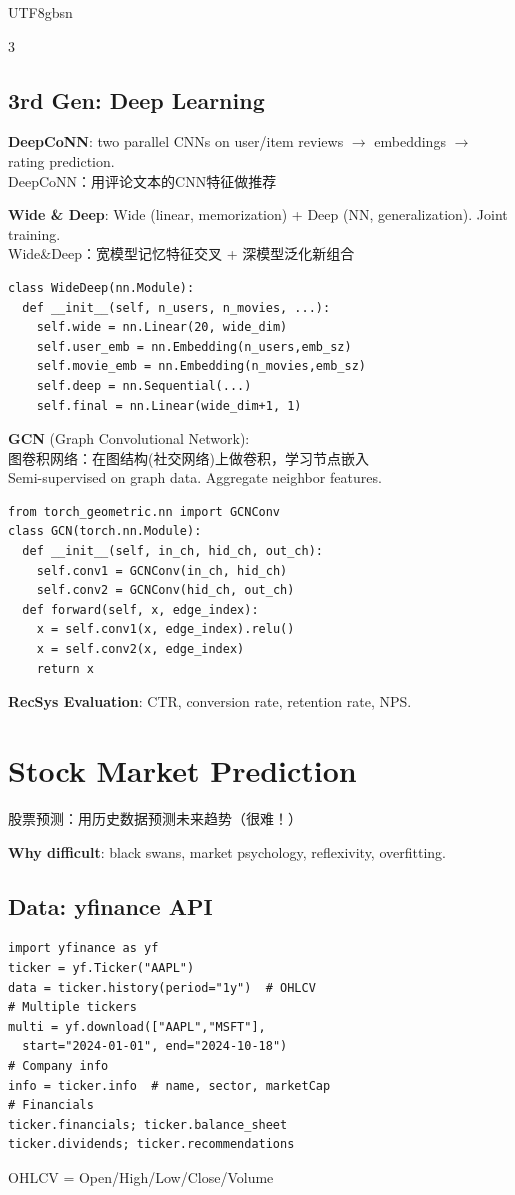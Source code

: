 \documentclass[9pt,landscape,a4paper]{article}
\newcommand{\zhint}[1]{{\scriptsize\color{gray!70!black}#1}}
\begin{document}
\begin{CJK}{UTF8}{gbsn}
\begin{multicols}{3}
\subsection{3rd Gen: Deep Learning}

\textbf{DeepCoNN}: two parallel CNNs on user/item reviews $\to$ embeddings $\to$ rating prediction.\\
\zhint{DeepCoNN：用评论文本的CNN特征做推荐}

\textbf{Wide \& Deep}: Wide (linear, memorization) + Deep (NN, generalization). Joint training.\\
\zhint{Wide\&Deep：宽模型记忆特征交叉 + 深模型泛化新组合}

\begin{lstlisting}
class WideDeep(nn.Module):
  def __init__(self, n_users, n_movies, ...):
    self.wide = nn.Linear(20, wide_dim)
    self.user_emb = nn.Embedding(n_users,emb_sz)
    self.movie_emb = nn.Embedding(n_movies,emb_sz)
    self.deep = nn.Sequential(...)
    self.final = nn.Linear(wide_dim+1, 1)
\end{lstlisting}

\textbf{GCN} (Graph Convolutional Network):\\
\zhint{图卷积网络：在图结构(社交网络)上做卷积，学习节点嵌入}\\
Semi-supervised on graph data. Aggregate neighbor features.
\begin{lstlisting}
from torch_geometric.nn import GCNConv
class GCN(torch.nn.Module):
  def __init__(self, in_ch, hid_ch, out_ch):
    self.conv1 = GCNConv(in_ch, hid_ch)
    self.conv2 = GCNConv(hid_ch, out_ch)
  def forward(self, x, edge_index):
    x = self.conv1(x, edge_index).relu()
    x = self.conv2(x, edge_index)
    return x
\end{lstlisting}

\textbf{RecSys Evaluation}: CTR, conversion rate, retention rate, NPS.

\section{Stock Market Prediction}
\zhint{股票预测：用历史数据预测未来趋势（很难！）}

\textbf{Why difficult}: black swans, market psychology, reflexivity, overfitting.

\subsection{Data: yfinance API}
\begin{lstlisting}
import yfinance as yf
ticker = yf.Ticker("AAPL")
data = ticker.history(period="1y")  # OHLCV
# Multiple tickers
multi = yf.download(["AAPL","MSFT"],
  start="2024-01-01", end="2024-10-18")
# Company info
info = ticker.info  # name, sector, marketCap
# Financials
ticker.financials; ticker.balance_sheet
ticker.dividends; ticker.recommendations
\end{lstlisting}
\zhint{OHLCV = Open/High/Low/Close/Volume}


\end{multicols}
\end{CJK}
\end{document}
